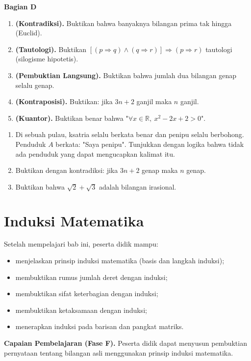 \documentclass[11pt,a4paper]{report}
\theoremstyle{gaya}
\newcommand{\bagiansoal}[2]{%
  \par\medskip\noindent
  {\large\bfseries\color{biru}Bagian #1}\par\smallskip
  \addcontentsline{toc}{subsection}{Bagian #1}}
\begin{document}
\bagiansoal{D}{(Expert --- setara tahun pertama universitas, sintesis \& pembuktian)}
\begin{enumerate}[leftmargin=*]
  \item \textbf{(Kontradiksi).} Buktikan bahwa banyaknya bilangan prima tak hingga (Euclid).
  \item \textbf{(Tautologi).} Buktikan $[(p\Rightarrow q)\wedge(q\Rightarrow r)]\Rightarrow(p\Rightarrow r)$ tautologi (silogisme hipotetis).
  \item \textbf{(Pembuktian Langsung).} Buktikan bahwa jumlah dua bilangan genap selalu genap.
  \item \textbf{(Kontraposisi).} Buktikan: jika $3n+2$ ganjil maka $n$ ganjil.
  \item \textbf{(Kuantor).} Buktikan benar bahwa "$\forall x\in\mathbb{R},\ x^2-2x+2>0$".
\end{enumerate}

\begin{challenge}
\begin{enumerate}[leftmargin=*,topsep=2pt]
  \item Di sebuah pulau, ksatria selalu berkata benar dan penipu selalu berbohong. Penduduk $A$ berkata: "Saya penipu". Tunjukkan dengan logika bahwa tidak ada penduduk yang dapat mengucapkan kalimat itu.
  \item Buktikan dengan kontradiksi: jika $3n+2$ genap maka $n$ genap.
  \item Buktikan bahwa $\sqrt2+\sqrt3$ adalah bilangan irasional.
\end{enumerate}
\end{challenge}

\chapter{Induksi Matematika}
\begin{tujuan}
Setelah mempelajari bab ini, peserta didik mampu:
\begin{itemize}[leftmargin=*,topsep=2pt]
  \item menjelaskan prinsip induksi matematika (basis dan langkah induksi);
  \item membuktikan rumus jumlah deret dengan induksi;
  \item membuktikan sifat keterbagian dengan induksi;
  \item membuktikan ketaksamaan dengan induksi;
  \item menerapkan induksi pada barisan dan pangkat matriks.
\end{itemize}
\textbf{Capaian Pembelajaran (Fase F).} Peserta didik dapat menyusun pembuktian pernyataan tentang bilangan asli menggunakan prinsip induksi matematika.
\end{tujuan}
\end{document}

